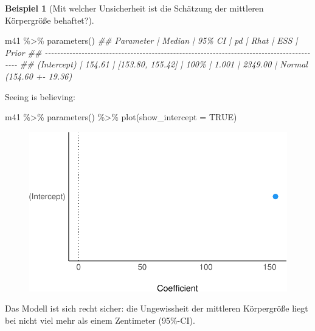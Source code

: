 \documentclass[
  a4paper,
  DIV=11]{scrreprt}
\newenvironment{Shaded}{\begin{snugshade}}{\end{snugshade}}
\newcommand{\AttributeTok}[1]{\textcolor[rgb]{0.40,0.45,0.13}{#1}}
\newcommand{\ConstantTok}[1]{\textcolor[rgb]{0.56,0.35,0.01}{#1}}
\newcommand{\DocumentationTok}[1]{\textcolor[rgb]{0.37,0.37,0.37}{\textit{#1}}}
\newcommand{\FunctionTok}[1]{\textcolor[rgb]{0.28,0.35,0.67}{#1}}
\newcommand{\NormalTok}[1]{\textcolor[rgb]{0.00,0.23,0.31}{#1}}
\newcommand{\SpecialCharTok}[1]{\textcolor[rgb]{0.37,0.37,0.37}{#1}}
\theoremstyle{definition}
\newtheorem{example}{Beispiel}[chapter]
\theoremstyle{remark}
\begin{document}
\leavevmode{}%
\begin{example}[Mit welcher Unsicherheit ist die Schätzung der mittleren
Körpergröße behaftet?]\label{exm-kung5}

\begin{Shaded}
\begin{Highlighting}[]
\NormalTok{m41 }\SpecialCharTok{\%\textgreater{}\%} 
  \FunctionTok{parameters}\NormalTok{()}
\DocumentationTok{\#\# Parameter   | Median |           95\% CI |   pd |  Rhat |     ESS |                    Prior}
\DocumentationTok{\#\# {-}{-}{-}{-}{-}{-}{-}{-}{-}{-}{-}{-}{-}{-}{-}{-}{-}{-}{-}{-}{-}{-}{-}{-}{-}{-}{-}{-}{-}{-}{-}{-}{-}{-}{-}{-}{-}{-}{-}{-}{-}{-}{-}{-}{-}{-}{-}{-}{-}{-}{-}{-}{-}{-}{-}{-}{-}{-}{-}{-}{-}{-}{-}{-}{-}{-}{-}{-}{-}{-}{-}{-}{-}{-}{-}{-}{-}{-}{-}{-}{-}{-}{-}{-}{-}{-}{-}{-}{-}{-}{-}}
\DocumentationTok{\#\# (Intercept) | 154.61 | [153.80, 155.42] | 100\% | 1.001 | 2349.00 | Normal (154.60 +{-} 19.36)}
\end{Highlighting}
\end{Shaded}

Seeing is believing:

\begin{Shaded}
\begin{Highlighting}[]
\NormalTok{m41 }\SpecialCharTok{\%\textgreater{}\%} 
  \FunctionTok{parameters}\NormalTok{() }\SpecialCharTok{\%\textgreater{}\%} 
  \FunctionTok{plot}\NormalTok{(}\AttributeTok{show\_intercept =} \ConstantTok{TRUE}\NormalTok{)}
\end{Highlighting}
\end{Shaded}

\begin{figure}[H]

{\centering \includegraphics{./gauss_files/figure-pdf/unnamed-chunk-6-1.pdf}

}

\end{figure}

Das Modell ist sich recht sicher: die Ungewissheit der mittleren
Körpergröße liegt bei nicht viel mehr als einem Zentimeter (95\%-CI).

\end{example}
\end{document}
